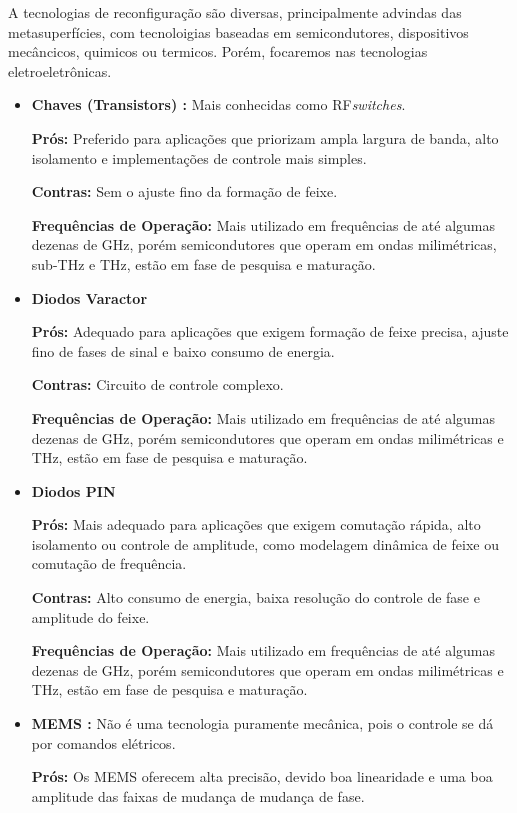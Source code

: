 \documentclass[
	12pt,				%
	openright,			%
	oneside,			%
	a4paper,			%
	english,			%
	brazil				%
	]{abntex2}
\begin{document}
A tecnologias de reconfiguração são diversas, principalmente advindas das metasuperfícies, com tecnoloigias baseadas em semicondutores, dispositivos mecâncicos, quimicos ou termicos. Porém, focaremos nas tecnologias eletroeletrônicas.
\begin{itemize}
\item \textbf{Chaves (Transistors) :} Mais conhecidas como RF\textit{switches}.

 \textbf{Prós:} Preferido para aplicações que priorizam ampla largura de banda, alto isolamento e implementações de controle mais simples.
    
\textbf{Contras:} Sem o ajuste fino da formação de feixe.

   \textbf{Frequências de Operação:} Mais utilizado em frequências de até algumas dezenas de GHz, porém semicondutores que operam em ondas milimétricas, sub-THz e THz, estão em fase de pesquisa e maturação.
   
\item \textbf{Diodos Varactor}

    \textbf{Prós:} Adequado para aplicações que exigem formação de feixe precisa, ajuste fino de fases de sinal e baixo consumo de energia.

    \textbf{Contras:} Circuito de controle complexo.

    \textbf{Frequências de Operação:} Mais utilizado em frequências de até algumas dezenas de GHz, porém semicondutores que operam em ondas milimétricas e THz, estão em fase de pesquisa e maturação.


\item \textbf{Diodos PIN}

    \textbf{Prós:} Mais adequado para aplicações que exigem comutação rápida, alto isolamento ou controle de amplitude, como modelagem dinâmica de feixe ou comutação de frequência.

    \textbf{Contras:} Alto consumo de energia, baixa resolução do controle de fase e amplitude do feixe.

    \textbf{Frequências de Operação:} Mais utilizado em frequências de até algumas dezenas de GHz, porém semicondutores que operam em ondas milimétricas e THz, estão em fase de pesquisa e maturação.


\item \textbf{MEMS :} Não é uma tecnologia puramente mecânica, pois o controle se dá por comandos elétricos.

    \textbf{Prós:} Os MEMS oferecem alta precisão, devido boa linearidade e uma boa amplitude das faixas de mudança de mudança de fase. 


\end{itemize}
\end{document}
